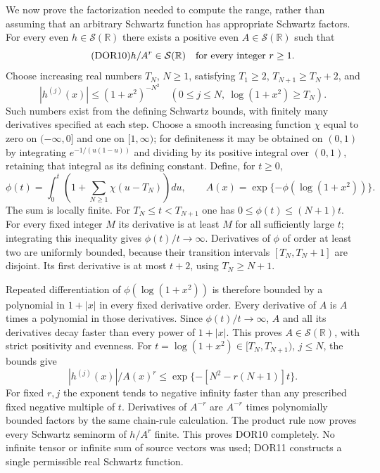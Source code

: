 We now prove the factorization needed to compute the range, rather
than assuming that an arbitrary Schwartz function has appropriate
Schwartz factors. For every even $h\in\mathcal S(\mathbb R)$ there
exists a positive even $A\in\mathcal S(\mathbb R)$ such that
\begin{equation}\tag{DOR10}
h/A^r\in\mathcal S(\mathbb R)\quad\hbox{for every integer }r\ge1.
\end{equation}
Choose increasing real numbers $T_N$, $N\ge1$, satisfying
$T_1\ge2$, $T_{N+1}\ge T_N+2$, and
\[
|h^{(j)}(x)|\le(1+x^2)^{-N^2}
\quad(0\le j\le N,\ \log(1+x^2)\ge T_N).
\]
Such numbers exist from the defining Schwartz bounds, with finitely
many derivatives specified at each step. Choose a smooth increasing
function $\chi$ equal to zero on $(-\infty,0]$ and one on
$[1,\infty)$; for definiteness it may be obtained on $(0,1)$ by
integrating $e^{-1/(u(1-u))}$ and dividing by its positive integral
over $(0,1)$, retaining that integral as its defining constant.
Define, for $t\ge0$,
\begin{equation}\tag{DOR11}
\phi(t)=\int_0^t\left(1+\sum_{N\ge1}\chi(u-T_N)\right)du,
\qquad A(x)=\exp\{-\phi(\log(1+x^2))\}.
\end{equation}
The sum is locally finite. For $T_N\le t<T_{N+1}$ one has
$0\le\phi(t)\le(N+1)t$. For every fixed integer $M$ its derivative
is at least $M$ for all sufficiently large $t$; integrating this
inequality gives $\phi(t)/t\to\infty$. Derivatives of $\phi$ of
order at least two are uniformly bounded, because their transition
intervals $[T_N,T_N+1]$ are disjoint. Its first derivative is at
most $t+2$, using $T_N\ge N+1$.

Repeated differentiation of $\phi(\log(1+x^2))$ is therefore
bounded by a polynomial in $1+|x|$ in every fixed derivative
order. Every derivative of $A$ is $A$ times a polynomial in those
derivatives. Since $\phi(t)/t\to\infty$, $A$ and all its
derivatives decay faster than every power of $1+|x|$. This proves
$A\in\mathcal S(\mathbb R)$, with strict positivity and evenness.
For $t=\log(1+x^2)\in[T_N,T_{N+1})$, $j\le N$, the bounds give
\[
|h^{(j)}(x)|/A(x)^r
\le\exp\{-[N^2-r(N+1)]t\}.
\]
For fixed $r,j$ the exponent tends to negative infinity faster
than any prescribed fixed negative multiple of $t$. Derivatives
of $A^{-r}$ are $A^{-r}$ times polynomially bounded factors by
the same chain-rule calculation. The product rule now proves every
Schwartz seminorm of $h/A^r$ finite. This proves DOR10 completely.
No infinite tensor or infinite sum of source vectors was used;
DOR11 constructs a single permissible real Schwartz function.

